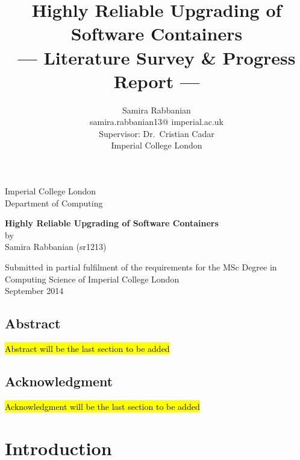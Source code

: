 \documentclass[a4paper,11pt,twoside]{report}
\title{Highly Reliable Upgrading of Software Containers\\\Large{--- Literature Survey \& Progress Report ---}}
\author{Samira Rabbanian\\
  samira.rabbanian13@ imperial.ac.uk \\
  \small{Supervisor: Dr.\ Cristian Cadar}\\
  \small{Imperial College London}}
\newcommand\blankpage{%
\null
\thispagestyle{empty}%
\addtocounter{page}{-1}%
\newpage}
\begin{document}
\maketitle

\begin{titlepage}
    \begin{center}
        \vspace*{2cm}
        
        \large
        {\Large Imperial College London}\\
        \large
         \vspace*{0.2cm}
        {\Large Department of Computing}
        
        \vspace{4.5 cm}
        \large
        {\huge \textbf{Highly Reliable Upgrading of Software Containers}}\\
        \vspace{1.0 cm}
        {\Large by}\\
        {\Large Samira Rabbanian (sr1213)}
        
        \vspace{10cm}
        

  	\large {\Large Submitted in partial fulfilment of the requirements for the MSc Degree in Computing Science of Imperial College London }\\
  	
\vspace*{1 cm}  	
  \large{\Large September 2014}\\ 
           
    \end{center}
\end{titlepage}
\afterpage{\blankpage}
\clearpage

\section*{Abstract}
\hl{Abstract will be the last section to be added}
\afterpage{\blankpage}
\clearpage

\section*{Acknowledgment}
\hl{Acknowledgment will be the last section to be added}
\afterpage{\blankpage}
\clearpage

\tableofcontents
\clearpage

\listoffigures
\clearpage

\chapter{Introduction}
\end{document}
